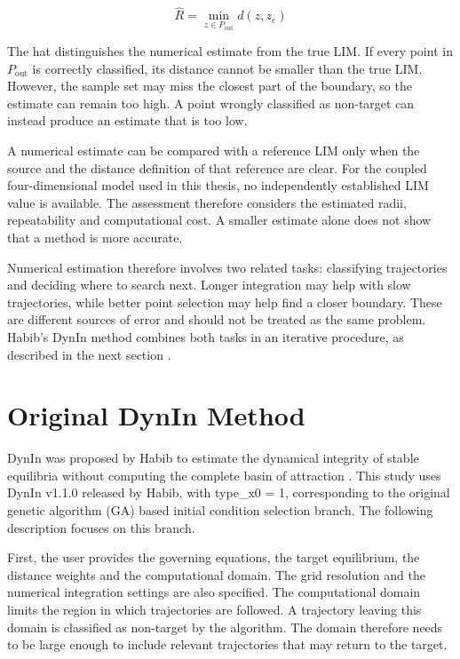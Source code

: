 \begin{equation}
  \hat{R} = \min_{z \in  {P}_{\mathrm{out}}} d(z, {z}_{e})
\end{equation}

The hat distinguishes the numerical estimate from the true LIM. If every point in ${P}_{\mathrm{out}}$ is correctly classified, its distance cannot be smaller than the true LIM. However, the sample set may miss the closest part of the boundary, so the estimate can remain too high. A point wrongly classified as non-target can instead produce an estimate that is too low.

\begin{revision}
A numerical estimate can be compared with a reference LIM only when the source and the distance definition of that reference are clear. For the coupled four-dimensional model used in this thesis, no independently established LIM value is available. The assessment therefore considers the estimated radii, repeatability and computational cost. A smaller estimate alone does not show that a method is more accurate.
\end{revision}

Numerical estimation therefore involves two related tasks: classifying trajectories and deciding where to search next. Longer integration may help with slow trajectories, while better point selection may help find a closer boundary. These are different sources of error and should not be treated as the same problem. Habib's DynIn method combines both tasks in an iterative procedure, as described in the next section \cite{ref12}.

\section{Original DynIn Method}

\begin{revision}
DynIn was proposed by Habib to estimate the dynamical integrity of stable equilibria without computing the complete basin of attraction \cite{ref12}. This study uses DynIn v1.1.0 released by Habib, with type\_x0 = 1, corresponding to the original genetic algorithm (GA) based initial condition selection branch. The following description focuses on this branch.
\end{revision}

First, the user provides the governing equations, the target equilibrium, the distance weights and the computational domain. The grid resolution and the numerical integration settings are also specified. The computational domain limits the region in which trajectories are followed. A trajectory leaving this domain is classified as non-target by the algorithm. The domain therefore needs to be large enough to include relevant trajectories that may return to the target.

